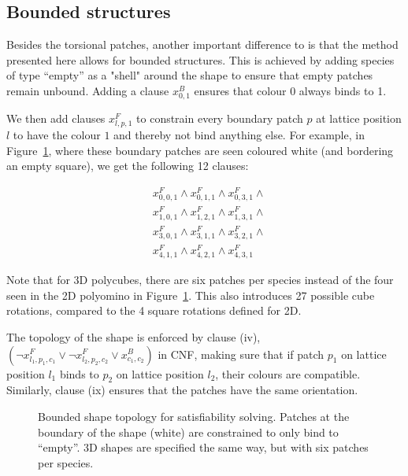 \subsection{Bounded structures}
Besides the torsional patches, another important difference to \cite{romano2020designing} is that the method presented here allows for bounded structures. This is achieved by adding species of type ``empty'' as a "shell" around the shape to ensure that empty patches remain unbound. Adding a clause \(x_{0,1}^{B}\) ensures that colour 0 always binds to 1. 

We then add clauses \(x_{l,p,1}^{F}\) to constrain every boundary patch \(p\) at lattice position \(l\) to have the colour \(1\) and thereby not bind anything else. For example, in Figure~\ref{fig:sat_boundary}, where these boundary patches are seen coloured white (and bordering an empty square), we get the following 12 clauses:

\begin{equation}
    \begin{aligned}
        &x_{0,0,1}^{F} \land x_{0,1,1}^{F} \land x_{0,3,1}^{F} \land \\
        &x_{1,0,1}^{F} \land x_{1,2,1}^{F} \land x_{1,3,1}^{F} \land \\
        &x_{3,0,1}^{F} \land x_{3,1,1}^{F} \land x_{3,2,1}^{F} \land \\
        &x_{4,1,1}^{F} \land x_{4,2,1}^{F} \land x_{4,3,1}^{F}
    \end{aligned}
\end{equation}

Note that for 3D polycubes, there are six patches per species instead of the four seen in the 2D polyomino in Figure~\ref{fig:sat_boundary}. This also introduces 27 possible cube rotations, compared to the 4 square rotations defined for 2D.

The topology of the shape is enforced by clause (iv), \(\left(\lnot x_{l_1, p_1, c_1}^{F} \lor \lnot x_{l_2, p_2, c_2}^{F} \lor x_{c_1, c_2}^{B}\right)\) in CNF, making sure that if patch \(p_1\) on lattice position \(l_1\) binds to \(p_2\) on lattice position \(l_2\), their colours are compatible. Similarly, clause (ix) ensures that the patches have the same orientation.


\begin{figure}[h]
    \centering
    \caption{Bounded shape topology for satisfiability solving. Patches at the boundary of the shape (white) are constrained to only bind to ``empty''. 3D shapes are specified the same way, but with six patches per species.}
    \label{fig:sat_boundary}
\end{figure}

